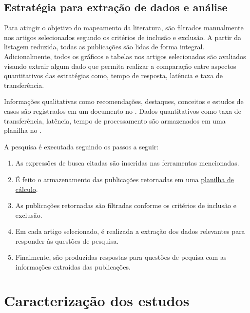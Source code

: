 \subsection{Estratégia para extração de dados e análise}
Para atingir o objetivo do mapeamento da literatura, são filtrados manualmente nos artigos selecionados segundo os critérios de inclusão e exclusão. A partir da listagem reduzida, todas as publicações são lidas de forma integral.
Adicionalmente, todos os gráficos e tabelas nos artigos selecionados são avaliados visando extrair algum dado que permita realizar a comparação entre aspectos quantitativos das estratégias como, tempo de resposta, latência e taxa de transferência.

Informações qualitativas como recomendações, destaques, conceitos e estudos de casos são registrados em um documento no . Dados quantitativos como taxa de transferência, latência, tempo de processamento são armazenados em uma planilha no . 

A pesquisa é executada seguindo os passos a seguir:
\begin{enumerate}
    \item As expressões de busca citadas são inseridas nas ferramentas mencionadas.
    \item É feito o armazenamento das publicações retornadas em uma \href{https://docs.google.com/spreadsheets/d/1rtH8Jl1EHguqZ4Py2mgV3pab7IQzt72-Sv2S1jPzLsQ/edit?usp=sharing}{planilha de cálculo}.
    \item As publicações retornadas são filtradas conforme os critérios de inclusão e exclusão.
    \item Em cada artigo selecionado, é realizada a extração dos dados relevantes para responder às questões de pesquisa.
    \item Finalmente, são produzidas respostas para questões de pequisa com as informações extraídas das publicações.
\end{enumerate}

\section{Caracterização dos estudos}

